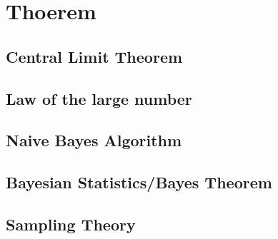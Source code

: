 \graphicspath{%
{chapter4graph/}%
{chapter4graph/bg/}}


\chapter{Thoerem}



\section{Central Limit Theorem}

\section{Law of the large number}

\section{Naive Bayes Algorithm}

\section{Bayesian Statistics/Bayes Theorem}

\section{Sampling Theory}



